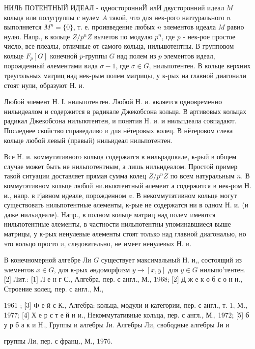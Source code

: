 \documentclass[10pt]{article}
\begin{document}
НИЛЬ ПОТЕНТНЫЙ ИДЕАЛ - односторонниЙ илИ двусторонний идеал $M$ кольца или полугруппы с нулем $A$ такой, что для нек-рого наттурального $n$ выполняется $M^{n}=\{0\}$, т. е. проивведение любых $n$ элементов идеала $M$ равно нулю. Напр., в кольце $Z / p^{n} Z$ вычетов по модулю $p^{n}$, где $p$ - нек-рое простое число, все плеалы, отличные от самого кольца, нильшотентны. В групповом кольце $F_{p}[G]$ конечной $p$-группы $G$ над полем из $p$ элементов идеал, порожденный әлементами вида $\sigma-1$, где $\sigma \in G$, нильпотентен. В кольце верхних треугольных матриц над нек-рым полем матрицы, у к-рых на главной диагонали стоят нули, образуют Н. и.



Любой элемент Н. І. нильпотентен. Любой Н. и. является одновременно нильидеалом и содержится в радикале Джекобсона кольца. В артивовых кольцах радикал Джекобсона нильпотентен, и понятия Н. и. и нильпдеала совпадают. Последнее свойство справедливо и для нётеровых колец. В нётеровом слева кольце любой левый (правый) нильидеал нильпотентен.



Все Н. и. коммутативного кольца содержатся в нильрадпкале, к-рый в общем случае может быть не нильпотентным, а лишь нильидеалом. Простой пример такой ситуации доставляет прямая сумма колец $Z / p^{n} Z$ по всем натуральным $n$. В коммутативном кольце любой ни.иьпотентный әлемеит а содержится в нек-ром Н. и., напр. в гјавном идеале, порожденном $a$. В некоммутативном кольце могут существовать нильпотентные әлементы, к-рые не содержатся ни в одном Н. и. (и даже нильидеале). Напр., в полном кольце матриц над полем имеются нильпотентные әлементы, в частности нильпотентны упоминавшиеся выше матрицы, у к-рых ненулевые әлементы стоят только над главной диагональю, но это кольцо просто и, следовательно, не имеет ненулевых Н. и.



В конечномерной алгебре Ли $G$ существует максимальный Н. и,, состоящий из элементов $x \in G$, для к-рых әндоморфизм $y \rightarrow[x, y]$ для $y \in G$ нилыпо'тентен. [2] Лит.: [1] Л е н г С., Алгебра, пер. с англ., М., 1968; [2] Д ж е к о б с о н н., Строение колец, пер. с англ., М.,

1961 ; [3] Ф е й с К., Алгебра: кольца, модули и категории, пер. с англ., т. 1, М., 1977; [4] Х е р с т е й н и., Некоммутативные кольца, пер. с англ., М., 1972; [5] б у р б а к и Н., Группы и алгебры Ји. Алгебры Ли, свободные алгебры Ји и

группы Ли, пер. с франц., М., 1976.
\end{document}
